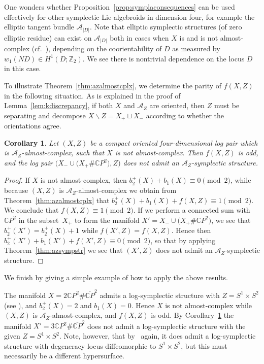 \documentclass[10pt,a4paper]{amsart}
\numberwithin{equation}{section}
\newtheorem{Corollary}[Theorem]{Corollary}
\begin{document}
\begin{Remark} One wonders whether Proposition~\ref{prop:symplaconsequences} can be used effectively for other symplectic Lie algebroids in dimension four, for example the elliptic tangent bundle $\mathcal{A}_{|D|}$. Note that elliptic symplectic structures (of zero elliptic residue) can exist on $\mathcal{A}_{|D|}$ both in cases when $X$ is and is not almost-complex (cf.\ \cite{BehrensCavalcantiKlaasse18}), depending on the coorientability of $D$ as measured by $w_1(ND) \in H^1(D;\mathbb{Z}_2)$. We see there is nontrivial dependence on the locus $D$ in this case.
\end{Remark}

To illustrate Theorem~\ref{thm:azalmostcplx}, we determine the parity of $f(X,Z)$ in the following situation. As is explained in the proof of Lemma~\ref{lem:kdiscrepancy}, if both $X$ and $\mathcal{A}_Z$ are oriented, then $Z$ must be separating and decompose $X\backslash Z = X_+ \sqcup X_-$ according to whether the orientations agree.

\begin{Corollary}\label{cor:aznosympconn} Let $(X,Z)$ be a compact oriented four-dimensional log pair which is $\mathcal{A}_Z$-almost-complex, such that $X$ is not almost-complex. Then $f(X,Z)$ is odd, and the log pair $\big(X_- \cup \big(X_+ \# \mathbb{C} P^2\big), Z\big)$ does not admit an $\mathcal{A}_Z$-symplectic structure.
\end{Corollary}

\begin{proof} If $X$ is not almost-complex, then $b_2^+(X) + b_1(X) \equiv 0 \pmod 2$, while because $(X,Z)$ is $\mathcal{A}_Z$-almost-complex we obtain from Theorem~\ref{thm:azalmostcplx} that $b_2^+(X) + b_1(X) + f(X,Z) \equiv 1 \pmod 2$. We conclude that $f(X,Z) \equiv 1 \pmod 2$. If we perform a connected sum with $\mathbb{C} P^2$ in the subset~$X_+$ to form the manifold $X' = X_- \cup \big(X_+ \# \mathbb{C} P^2\big)$, we see that $b_2^+(X') = b_2^+(X) + 1$ while $f(X',Z) = f(X,Z)$. Hence then $b_2^+(X') + b_1(X') + f(X',Z) \equiv 0 \pmod 2$, so that by applying Theorem~\ref{thm:azsympstr} we see that $(X',Z)$ does not admit an $\mathcal{A}_Z$-symplectic structure.
\end{proof}

We finish by giving a simple example of how to apply the above results.

\begin{Example} The manifold $X = 2 \mathbb{C} P^2 \# \overline{\mathbb{C} P}^2$ admits a log-symplectic structure with $Z = S^1 \times S^2$ (see \cite{Cavalcanti17}), and $b_2^+(X) = 2$ and $b_1(X) = 0$. Hence $X$ is not almost-complex while $(X,Z)$ is $\mathcal{A}_Z$-almost-complex, and $f(X,Z)$ is odd. By Corollary~\ref{cor:aznosympconn} the manifold $X' = 3 \mathbb{C} P^2 \# \overline{\mathbb{C} P}^2$ does not admit a log-symplectic structure with the given $Z = S^1 \times S^2$. Note, however, that by~\cite{Cavalcanti17} again, it does admit a log-symplectic structure with degeneracy locus diffeomorphic to $S^1 \times S^2$, but this must necessarily be a different hypersurface.
\end{Example}
\end{document}
